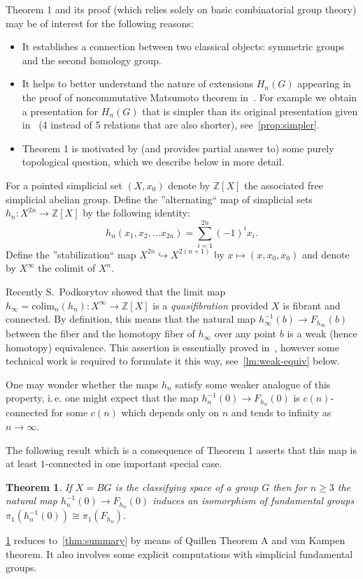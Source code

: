 \documentclass[oneside, 10pt]{amsart}
\theoremstyle{plain}
\newtheorem{thm}{Theorem}
\numberwithin{equation}{section}
\numberwithin{lemma}{section}
\theoremstyle{remark}
\theoremstyle{definition}
\newcommand{\ZZ}{\mathbb{Z}}
\begin{document}
Theorem 1 and its proof (which relies solely on basic combinatorial group theory) may be of interest for the following reasons:
\begin{itemize}
 \item It establishes a connection between two classical objects: symmetric groups and the second homology group.
 \item It helps to better understand the nature of extensions $H_n(G)$ appearing in the proof of noncommutative Matsumoto theorem in~\cite{Reh78}.
       For example we obtain a presentation for $H_n(G)$ that is simpler than its original presentation given in~\cite{Reh78}
       (4 instead of 5 relations that are also shorter), see~\cref{prop:simpler}.
 \item Theorem 1 is motivated by (and provides partial answer to) some purely topological question, which we describe below in more detail.
\end{itemize}

For a pointed simplicial set $(X, x_0)$ denote by $\ZZ[X]$ the associated free simplicial abelian group.
Define the ''alternating`` map of simplicial sets $h_n\colon X^{2n} \to \ZZ[X]$ by the following identity:
 \[h_n(x_1, x_2, \ldots x_{2n}) = \sum\limits_{i=1}^{2n}(-1)^ix_i.\]
Define the ''stabilization`` map $X^{2n} \hookrightarrow X^{2(n+1)}$ by $x \mapsto (x, x_0, x_0)$ and denote by $X^\infty$ the colimit of $X^n$.

Recently S.~Podkorytov showed that the limit map $h_\infty = \mathrm{colim}_n(h_n) \colon X^\infty \to \ZZ[X]$ is a {\it quasifibration}
 provided $X$ is fibrant and connected.
By definition, this means that the natural map $h^{-1}_\infty(b) \to F_{h_\infty}(b)$ between the fiber and the homotopy fiber of $h_\infty$ over any point $b$ is 
a weak (hence homotopy) equivalence.
This assertion is essentially proved in~\cite[Lemma~9.1]{Po17}, however some technical work is required to
  formulate it this way, see~\cref{lm:weak-equiv} below.

One may wonder whether the maps $h_n$ satisfy some weaker analogue of this property,
 i.\,e. one might expect that the map $h_n^{-1}(0) \to F_{h_n}(0)$ is $c(n)$-connected for some $c(n)$ which depends only on $n$ and tends to infinity as $n\to \infty$.
  
The following result which is a consequence of Theorem 1 asserts that this map is at least $1$-connected in one important special case.
\begin{thm} \label{thm:main} If $X=BG$ is the classifying space of a group $G$ then for $n\geq 3$
 the natural map $h_n^{-1}(0) \to F_{h_n}(0)$ induces an isomorphism of fundamental groups
 $\pi_1(h^{-1}_n(0))\cong \pi_1(F_{h_n})$. \end{thm}
\cref{thm:main} reduces to~\cref{thm:summary} by means of Quillen Theorem A and van Kampen theorem.
It also involves some explicit computations with simplicial fundamental groups.
\end{document}
